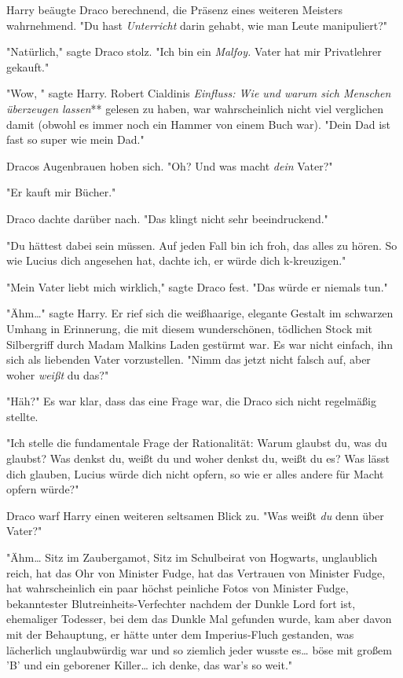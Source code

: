 {Harry beäugte Draco berechnend, die Präsenz eines weiteren Meisters wahrnehmend. "Du hast \emph{Unterricht} darin gehabt, wie man Leute manipuliert?"

"Natürlich," sagte Draco stolz. "Ich bin ein \emph{Malfoy.} Vater hat mir Privatlehrer gekauft."

"Wow, " sagte Harry. Robert Cialdinis \emph{Einfluss: Wie und warum sich Menschen überzeugen lassen}** gelesen zu haben, war wahrscheinlich nicht viel verglichen damit (obwohl es immer noch ein Hammer von einem Buch war). "Dein Dad ist fast so super wie mein Dad."

Dracos Augenbrauen hoben sich. "Oh? Und was macht \emph{dein} Vater?"

"Er kauft mir Bücher."

Draco dachte darüber nach. "Das klingt nicht sehr beeindruckend."

"Du hättest dabei sein müssen. Auf jeden Fall bin ich froh, das alles zu hören. So wie Lucius dich angesehen hat, dachte ich, er würde dich k-kreuzigen."

"Mein Vater liebt mich wirklich," sagte Draco fest. "Das würde er niemals tun."

"Ähm…" sagte Harry. Er rief sich die weißhaarige, elegante Gestalt im schwarzen Umhang in Erinnerung, die mit diesem wunderschönen, tödlichen Stock mit Silbergriff durch Madam Malkins Laden gestürmt war. Es war nicht einfach, ihn sich als liebenden Vater vorzustellen. "Nimm das jetzt nicht falsch auf, aber woher \emph{weißt} du das?"

"Häh?" Es war klar, dass das eine Frage war, die Draco sich nicht regelmäßig stellte.

"Ich stelle die fundamentale Frage der Rationalität: Warum glaubst du, was du glaubst? Was denkst du, weißt du und woher denkst du, weißt du es? Was lässt dich glauben, Lucius würde dich nicht opfern, so wie er alles andere für Macht opfern würde?"

Draco warf Harry einen weiteren seltsamen Blick zu. "Was weißt \emph{du} denn über Vater?"

"Ähm… Sitz im Zaubergamot, Sitz im Schulbeirat von Hogwarts, unglaublich reich, hat das Ohr von Minister Fudge, hat das Vertrauen von Minister Fudge, hat wahrscheinlich ein paar höchst peinliche Fotos von Minister Fudge, bekanntester Blutreinheits-Verfechter nachdem der Dunkle Lord fort ist, ehemaliger Todesser, bei dem das Dunkle Mal gefunden wurde, kam aber davon mit der Behauptung, er hätte unter dem Imperius-Fluch gestanden, was lächerlich unglaubwürdig war und so ziemlich jeder wusste es… böse mit großem 'B' und ein geborener Killer… ich denke, das war's so weit."

}
